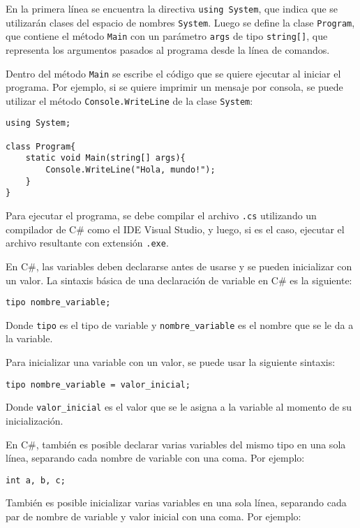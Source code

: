 \documentclass[executivepaper]{article}
\begin{document}
En la primera línea se encuentra la directiva \verb|using System|, que indica que se utilizarán clases del espacio de nombres \verb|System|. Luego se define la clase \verb|Program|, que contiene el método \verb|Main| con un parámetro \verb|args| de tipo \verb|string[]|, que representa los argumentos pasados al programa desde la línea de comandos.

Dentro del método \verb|Main| se escribe el código que se quiere ejecutar al iniciar el programa. Por ejemplo, si se quiere imprimir un mensaje por consola, se puede utilizar el método \verb|Console.WriteLine| de la clase \verb|System|:

\begin{lstlisting}
using System;

class Program{
    static void Main(string[] args){
        Console.WriteLine("Hola, mundo!");
    }
}
\end{lstlisting}

Para ejecutar el programa, se debe compilar el archivo \verb|.cs| utilizando un compilador de C\# como el IDE Visual Studio, y luego, si es el caso, ejecutar el archivo resultante con extensión \verb|.exe|.

En  C\#, las variables deben declararse antes de usarse y se pueden inicializar con un valor. La sintaxis básica de una declaración de variable en  C\# es la siguiente:

\begin{lstlisting}
tipo nombre_variable;
\end{lstlisting}

Donde \verb|tipo| es el tipo de variable y \verb|nombre_variable| es el nombre que se le da a la variable.

Para inicializar una variable con un valor, se puede usar la siguiente sintaxis:

\begin{lstlisting}
tipo nombre_variable = valor_inicial;
\end{lstlisting}

Donde \verb|valor_inicial| es el valor que se le asigna a la variable al momento de su inicialización.

En  C\#, también es posible declarar varias variables del mismo tipo en una sola línea, separando cada nombre de variable con una coma. Por ejemplo:

\begin{lstlisting}
int a, b, c;
\end{lstlisting}

También es posible inicializar varias variables en una sola línea, separando cada par de nombre de variable y valor inicial con una coma. Por ejemplo:
\end{document}

